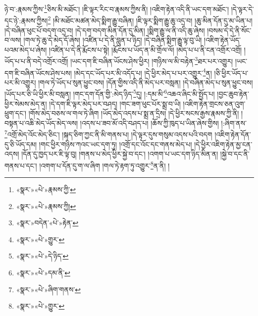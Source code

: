 ཉེ་བ་:རྣམས་ཀྱིས་\footnote{«སྣར་»«པེ་»རྣམས་ཀྱི་}ཅིས་མི་མཐོང་། །ཇི་ལྟར་རིང་བ་རྣམས་ཀྱིས་ནི། །འཇིག་རྟེན་འདི་ནི་ཡང་དག་མཐོང་། །དེ་ལྟར་དེ་དང་ཉེ་:རྣམས་ཀྱིས།\footnote{«སྣར་»«པེ་»རྣམས་ཀྱི།} །མི་མཐོང་མཚན་མེད་སྨིག་རྒྱུ་བཞིན། །ཇི་ལྟར་སྨིག་རྒྱུ་ཆུ་འདྲ་བ། །ཆུ་མིན་དོན་དུ་མ་ཡིན་པ། །དེ་བཞིན་ཕུང་པོ་བདག་འདྲ་བ། །དེ་དག་བདག་མིན་དོན་དུ་མིན། །སྨིག་རྒྱུ་ལ་ནི་འདི་ཆུ་ཞེས། །བསམ་དེ་དེ་ནི་སོང་བ་ལས། །གལ་ཏེ་ཆུ་དེ་མེད་དོ་ཞེས། །འཛིན་པ་དེ་ནི་བླུན་པ་ཉིད། །དེ་བཞིན་སྨིག་རྒྱུ་ལྟ་བུ་ཡི། །འཇིག་རྟེན་ཡོད་པའམ་མེད་པ་ཞེས། །འཛིན་པ་དེ་ནི་རྨོངས་པ་སྟེ། །རྨོངས་པ་ཡོད་ན་མི་གྲོལ་ལོ། །མེད་པ་པ་ནི་ངན་འགྲོར་འགྲོ། །ཡོད་པ་པ་ནི་བདེ་འགྲོར་འགྲོ། །ཡང་དག་ཇི་བཞིན་ཡོངས་ཤེས་ཕྱིར། །གཉིས་ལ་མི་བརྟེན་\footnote{«སྣར་»བདེན་«པེ་»རྟེན་}ཐར་པར་འགྱུར། །ཡང་དག་ཇི་བཞིན་ཡོངས་ཤེས་པས། །མེད་དང་ཡོད་པར་མི་འདོད་པ། །དེ་ཕྱིར་མེད་པ་པར་འགྱུར་\footnote{«སྣར་»«པེ་»གྱུར་}ན། །ཅི་ཕྱིར་ཡོད་པ་པར་མི་འགྱུར། །གལ་ཏེ་ཡོད་པ་སུན་ཕྱུང་བས། །དོན་གྱིས་འདི་ནི་མེད་པར་བསླན། །དེ་བཞིན་མེད་པ་སུན་ཕྱུང་བས། །ཡོད་པར་ཅི་ཡི་ཕྱིར་མི་བསླན། །གང་དག་དོན་གྱི་:མེད་ཉིད་\footnote{«སྣར་»«པེ་»དེ་ཉིད་}དུ། །:དམ་མི་\footnote{«སྣར་»«པེ་»དམ་ནི་}འཆའ་ཞིང་མི་སྤྱོད་པ། །བྱང་ཆུབ་རྟེན་ཕྱིར་སེམས་མེད་ན། །དེ་དག་ཇི་ལྟར་མེད་པར་བཤད། །གང་ཟག་ཕུང་པོར་སྨྲ་བ་ཡི། །འཇིག་རྟེན་གྲངས་ཅན་འུག་ཕྲུག་དང་། །གོས་མེད་བཅས་ལ་གལ་ཏེ་ཞིག །ཡོད་མེད་འདས་པ་སྨྲ་ན་དྲིས། །དེ་ཕྱིར་སངས་རྒྱས་རྣམས་ཀྱི་ནི། །བསྟན་པ་འཆི་མེད་ཡོད་མེད་ལས། །འདས་པ་ཟབ་མོ་འདི་བཤད་པ། །ཆོས་ཀྱི་ཁུད་པ་ཡིན་ཞེས་གྱིས། །:ཞིག་ནས་\footnote{«སྣར་»«པེ་»ཞིག་གནས་}འགྲོ་མེད་འོང་མེད་ཅིང་། །སྐད་ཅིག་ཀྱང་ནི་མི་གནས་པ། །དེ་ལྟར་དུས་གསུམ་འདས་པའི་བདག །འཇིག་རྟེན་དོན་དུ་ཅི་ཡོད་དམ། །གང་ཕྱིར་གཉིས་ཀའང་ཡང་དག་ཏུ། །འགྲོ་དང་འོང་དང་གནས་མེད་པ། །དེ་ཕྱིར་འཇིག་རྟེན་མྱ་ངན་འདས། །དོན་དུ་ཁྱད་པར་ཇི་ལྟ་བུ། །གནས་པ་མེད་ཕྱིར་སྐྱེ་བ་དང་། །འགག་པ་ཡང་དག་ཉིད་མིན་ན། །སྐྱེ་བ་དང་ནི་གནས་པ་དང་། །འགག་པ་དོན་དུ་ག་ལ་ཞིག །གལ་ཏེ་རྟག་ཏུ་འགྱུར་\footnote{«སྣར་»«པེ་»གྱུར་}ན་ནི། །
